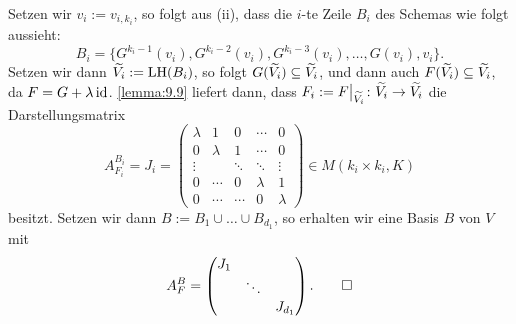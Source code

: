 \begin{beweis}
	Setzen wir $v_i := v_{i,k_i}$, so folgt aus (ii), dass die $i$-te Zeile $B_i$ des Schemas wie folgt aussieht:
	\[
		B_i = \{G^{k_i-1}(v_i), G^{k_i-2}(v_i), G^{k_i-3}(v_i),\dots,G(v_i),v_i\}.
	\]
	Setzen wir dann $\widetilde{V_i} := \operatorname{LH}(B_i)$, so folgt $G(\widetilde{V_i}) \subseteq \widetilde{V_i}$, und dann auch $F(\widetilde{V_i}) \subseteq \widetilde{V_i}$, da $F = G + \lambda \operatorname{id}$.
	\autoref{lemma:9.9} liefert dann, dass $F_i := F\big|_{\widetilde{V_i}} \colon \widetilde{V_i} \rightarrow \widetilde{V_i}$ die Darstellungsmatrix
	\[
		A_{F_i}^{B_i} = J_i = \begin{pmatrix}
		\lambda & 1 & 0 & \cdots & 0 \\ 
		0 & \lambda & 1 & \cdots & 0 \\ 
		\vdots &  & \ddots & \ddots & \vdots \\ 
		0 & \cdots & 0 & \lambda & 1 \\ 
		0 & \cdots & \cdots & 0 & \lambda
		\end{pmatrix} \in M(k_i \times k_i,K)
	\]
	besitzt.
	Setzen wir dann $B := B_1 \cup \dots \cup B_{d_1}$, so erhalten wir eine Basis $B$ von $V$ mit
	\[
	A_F^B = \begin{pmatrix}
	J_1 & & \\
	& \ddots & \\
	& & J_{d_1}
	\end{pmatrix}. \qedhere
	\]
\end{beweis}

